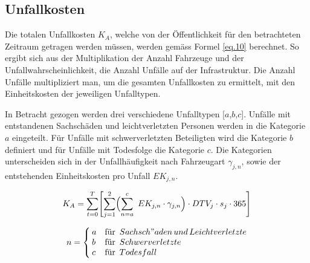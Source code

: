 \pagebreak


\subsection*{Unfallkosten}
\label{subsec:Unfall}

Die totalen Unfallkosten $K_{A}$, welche von der Öffentlichkeit für den betrachteten Zeitraum getragen werden müssen, werden gemäss Formel \ref{eq.10} berechnet. So ergibt sich aus der Multiplikation der Anzahl Fahrzeuge und der Unfallwahrscheinlichkeit, die Anzahl Unfälle auf der Infrastruktur. Die Anzahl Unfälle multipliziert man, um die gesamten Unfallkosten zu ermittelt, mit den Einheitskosten der jeweiligen Unfalltypen.

In Betracht gezogen werden drei verschiedene Unfalltypen [$a$,$b$,$c$].
Unfälle mit entstandenen Sachschäden und leichtverletzten Personen werden in die Kategorie $a$ eingeteilt. Für Unfälle mit schwerverletzten Beteiligten wird die Kategorie $b$ definiert und für Unfälle mit Todesfolge die Kategorie $c$. 
Die Kategorien unterscheiden sich in der Unfallhäufigkeit nach Fahrzeugart \( \gamma_{j,n} \), sowie der entstehenden Einheitskosten pro Unfall $EK_{j,n}$.

\begin{equation}
K_{A} = \sum_{t=0}^T \Biggl[ \sum_{j=1}^2 \Bigl( \sum_{n=a}^c \ EK_{j,n} \cdot \gamma_{j,n} \Bigr) \cdot DTV_{j} \cdot s_j \cdot 365 \Biggr] 
\label{eq.10}
\end{equation}

\begin{align*}
      n &=
      \begin{cases}
        \begin{aligned}
          & a  \\
          & b \\
          & c
        \end{aligned} &
        \begin{aligned}
         & \text{für}\ \thinspace \\
         & \text{für}\ \thinspace \\
         & \text{für}\ \thinspace
        \end{aligned}
        \begin{aligned}
          & {Sachsch"aden\,und\,Leichtverletzte} \\
          & {Schwerverletzte} \\
          & {Todesfall}
        \end{aligned}
      \end{cases}  \\
\end{align*}

